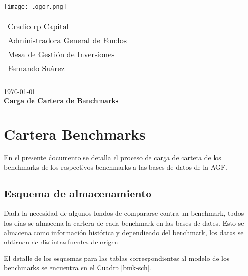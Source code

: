 \documentclass{article}
\begin{document}
\texttt{[image: logor.png]}
\vspace*{-1.55cm}

\hspace*{1.4 cm}
 \hspace*{2.9 cm}
 {\footnotesize
 \begin{tabular}{l}
  \sc Credicorp Capital\\
  \sc Administradora General de Fondos \\
  \sc Mesa de Gestión de Inversiones  \\
  \sc Fernando Suárez  \\
  \vspace{15\baselineskip}\mbox{}
  \vspace{-3mm}\mbox{}
 \end{tabular}
}

 \bigskip

\vspace*{5mm}
\begin{center}
{\today} \\
\vspace{3mm}
{\Large\bf Carga de Cartera de Benchmarks} \\
\vspace{2mm}
\end{center}
\section{Cartera Benchmarks}


En el presente documento se detalla el proceso de carga de cartera de los benchmarks de los respectivos benchmarks a las bases de datos de la AGF.


\subsection{Esquema de almacenamiento}


\par Dada la necesidad de algunos fondos de compararse contra un benchmark, todos los días se almacena la cartera de cada benchmark en las bases de datos. Esto se almacena como información histórica y dependiendo del benchmark, los datos se obtienen de distintas fuentes de origen..

El detalle de los esquemas para las tablas correspondientes al modelo de los benchmarks se encuentra en el Cuadro \ref{bmk-sch}.
\end{document}
